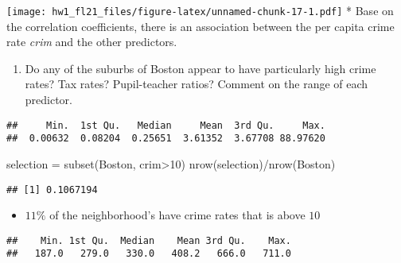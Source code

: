\documentclass[
]{article}
\newenvironment{Shaded}{\begin{snugshade}}{\end{snugshade}}
\newcommand{\DecValTok}[1]{\textcolor[rgb]{0.00,0.00,0.81}{#1}}
\newcommand{\FunctionTok}[1]{\textcolor[rgb]{0.00,0.00,0.00}{#1}}
\newcommand{\NormalTok}[1]{#1}
\newcommand{\OtherTok}[1]{\textcolor[rgb]{0.56,0.35,0.01}{#1}}
\newcommand{\SpecialCharTok}[1]{\textcolor[rgb]{0.00,0.00,0.00}{#1}}
\providecommand{\tightlist}{%
  \setlength{\itemsep}{0pt}\setlength{\parskip}{0pt}}
\begin{document}
\texttt{[image: hw1\_fl21\_files/figure-latex/unnamed-chunk-17-1.pdf]} *
Base on the correlation coefficients, there is an association between
the per capita crime rate \emph{crim} and the other predictors.

\begin{enumerate}
\def\labelenumi{(\alph{enumi})}
\setcounter{enumi}{3}
\tightlist
\item
  Do any of the suburbs of Boston appear to have particularly high crime
  rates? Tax rates? Pupil-teacher ratios? Comment on the range of each
  predictor.
\end{enumerate}

\begin{Shaded}
\end{Shaded}

\begin{verbatim}
##     Min.  1st Qu.   Median     Mean  3rd Qu.     Max. 
##  0.00632  0.08204  0.25651  3.61352  3.67708 88.97620
\end{verbatim}

\begin{Shaded}
\begin{Highlighting}[]
\NormalTok{selection }\OtherTok{=} \FunctionTok{subset}\NormalTok{(Boston, crim}\SpecialCharTok{\textgreater{}}\DecValTok{10}\NormalTok{)}
\FunctionTok{nrow}\NormalTok{(selection)}\SpecialCharTok{/}\FunctionTok{nrow}\NormalTok{(Boston)}
\end{Highlighting}
\end{Shaded}

\begin{verbatim}
## [1] 0.1067194
\end{verbatim}

\begin{itemize}
\tightlist
\item
  \(11\%\) of the neighborhood's have crime rates that is above \(10%
  \)
\end{itemize}

\begin{Shaded}
\end{Shaded}

\begin{verbatim}
##    Min. 1st Qu.  Median    Mean 3rd Qu.    Max. 
##   187.0   279.0   330.0   408.2   666.0   711.0
\end{verbatim}
\end{document}
